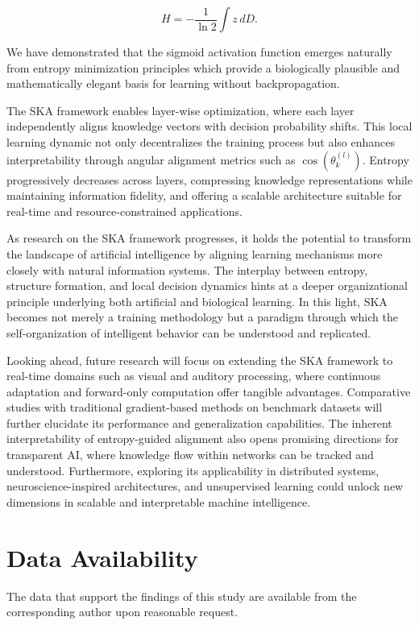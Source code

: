 \documentclass{article}
\begin{document}
\begin{equation}
	H = -\frac{1}{\ln 2} \int z \, dD.
\end{equation}

We have demonstrated that the sigmoid activation function emerges naturally from entropy minimization principles which provide a biologically plausible and mathematically elegant basis for learning without backpropagation.

The SKA framework enables layer-wise optimization, where each layer independently aligns knowledge vectors with decision probability shifts. This local learning dynamic not only decentralizes the training process but also enhances interpretability through angular alignment metrics such as \( \cos(\theta^{(l)}_k) \). Entropy progressively decreases across layers, compressing knowledge representations while maintaining information fidelity, and offering a scalable architecture suitable for real-time and resource-constrained applications.

As research on the SKA framework progresses, it holds the potential to transform the landscape of artificial intelligence by aligning learning mechanisms more closely with natural information systems. The interplay between entropy, structure formation, and local decision dynamics hints at a deeper organizational principle underlying both artificial and biological learning. In this light, SKA becomes not merely a training methodology but a paradigm through which the self-organization of intelligent behavior can be understood and replicated.

Looking ahead, future research will focus on extending the SKA framework to real-time domains such as visual and auditory processing, where continuous adaptation and forward-only computation offer tangible advantages. Comparative studies with traditional gradient-based methods on benchmark datasets will further elucidate its performance and generalization capabilities. The inherent interpretability of entropy-guided alignment also opens promising directions for transparent AI, where knowledge flow within networks can be tracked and understood. Furthermore, exploring its applicability in distributed systems, neuroscience-inspired architectures, and unsupervised learning could unlock new dimensions in scalable and interpretable machine intelligence.

\section*{Data Availability}
The data that support the findings of this study are available from the corresponding author upon reasonable request.
\end{document}
